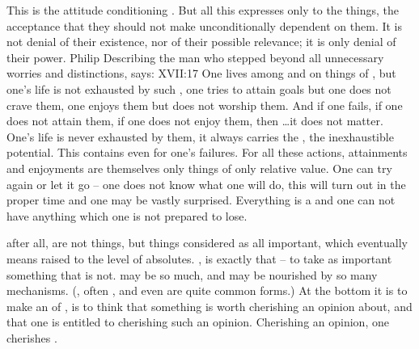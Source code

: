 This is the  attitude conditioning .  But all
this  expresses only  to the
 things, the acceptance that they should not make 
unconditionally dependent on them.  It is not denial of their existence, nor of
their possible relevance; it is only denial of their  power.
\citet{Fear not the flesh nor love it. If you fear it, it will gain mastery over
  you. If you love it, it will swallow and paralyze you.}{Philip}{ Describing
  the man who stepped beyond all unnecessary worries and distinctions,
  \citeauthor*{Ash} says:  XVII:17} One lives among and
 on things of , but one's life is not exhausted by such
, one tries to attain  goals but one does not crave
them, one enjoys them but does not worship them.  And if one fails, if one does
not attain them, if one does not enjoy them, then \ldots it does not matter.
One's life is never exhausted by them, it always carries the , the
inexhaustible potential.  This  contains  even for
one's failures.  For all these actions, attainments and enjoyments are
themselves only  things of only relative value.  One can try again
or let it go -- one does not know what one will do, this will turn out in the
proper time and one may be vastly surprised. Everything is a  and one
can not have anything which one is not prepared to lose.

  after all, 
 are not  things, but  things considered as
all important, which eventually means raised to the level of absolutes.
,  is exactly that -- to take as
 important something that is not.   may be so
much, and may be nourished by so many mechanisms. (, often
, and even  are
quite common forms.) At the bottom it is to make an  of ,
is to think that something  is worth cherishing an opinion about,
and that one is entitled to cherishing such an opinion.  Cherishing an
opinion, one cherishes .

